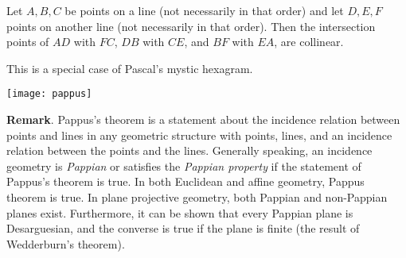 \documentclass{article}
\begin{document}
Let $A,B,C$ be points on a line (not necessarily in that order) and let $D,E,F$ points on another line (not necessarily in that order). Then the intersection points of $AD$ with $FC$, $DB$ with $CE$, and $BF$ with $EA$, are collinear.

This is a special case of Pascal's mystic hexagram.
\begin{center}
\texttt{[image: pappus]}
\end{center}

\textbf{Remark}.  Pappus's theorem is a statement about the incidence relation between points and lines in any geometric structure with points, lines, and an incidence relation between the points and the lines.  Generally speaking, an incidence geometry is \emph{Pappian} or satisfies the \emph{Pappian property} if the statement of Pappus's theorem is true.  In both Euclidean and affine geometry, Pappus theorem is true.  In plane projective geometry, both Pappian and non-Pappian planes exist.  Furthermore, it can be shown that every Pappian plane is Desarguesian, and the converse is true if the plane is finite (the result of Wedderburn's theorem).
\end{document}
